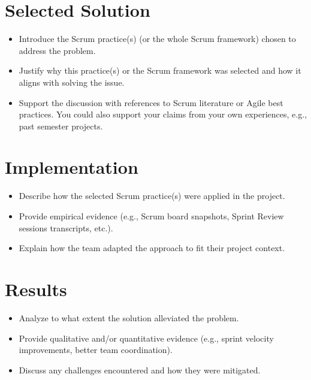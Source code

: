 \section{Selected Solution}

\begin{itemize}

    \item [-] Introduce the Scrum practice(s) (or the whole Scrum framework) chosen to address the problem.
    \item [-] Justify why this practice(s) or the Scrum framework was selected and how it aligns with solving the issue.
    \item [-] Support the discussion with references to Scrum literature or Agile best practices. You could also support your claims from your own experiences, e.g., past semester projects.

\end{itemize}

\section{Implementation}

\begin{itemize}

    \item [-] Describe how the selected Scrum practice(s) were applied in the project.
    \item [-] Provide empirical evidence (e.g., Scrum board snapshots, Sprint Review sessions transcripts, etc.).
    \item [-] Explain how the team adapted the approach to fit their project context.

\end{itemize}

\section{Results}

\begin{itemize}

    \item [-] Analyze to what extent the solution alleviated the problem.
    \item [-] Provide qualitative and/or quantitative evidence (e.g., sprint velocity improvements, better team coordination).
    \item [-] Discuss any challenges encountered and how they were mitigated.

\end{itemize}